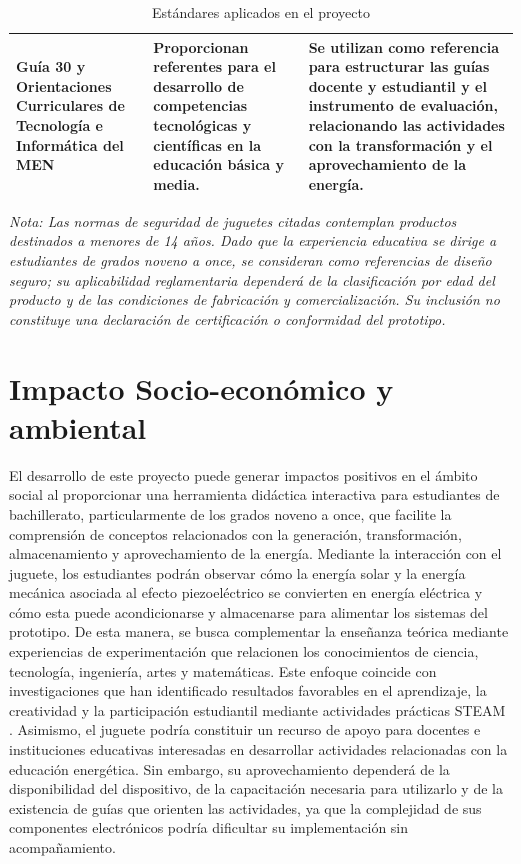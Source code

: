 \documentclass[11pt]{article}
\begin{document}
\begin{table}[H]
\begin{tabular}{|p{3.5cm}|p{5cm}|p{7cm}|}
Guía 30 y Orientaciones Curriculares de Tecnología e Informática del MEN &
Proporcionan referentes para el desarrollo de competencias tecnológicas y científicas en la educación básica y media. &
Se utilizan como referencia para estructurar las guías docente y estudiantil y el instrumento de evaluación, relacionando las actividades con la transformación y el aprovechamiento de la energía. \\
\hline

\end{tabular}

\caption{Estándares aplicados en el proyecto}
\label{tab:estandares}
\end{table}

\noindent\footnotesize
\textit{Nota: Las normas de seguridad de juguetes citadas contemplan productos destinados a menores de 14 años. Dado que la experiencia educativa se dirige a estudiantes de grados noveno a once, se consideran como referencias de diseño seguro; su aplicabilidad reglamentaria dependerá de la clasificación por edad del producto y de las condiciones de fabricación y comercialización. Su inclusión no constituye una declaración de certificación o conformidad del prototipo.}
\normalsize


\newpage
\section{Impacto Socio-económico y ambiental}
El desarrollo de este proyecto puede generar impactos positivos en el ámbito social al proporcionar una herramienta didáctica interactiva para estudiantes de bachillerato, particularmente de los grados noveno a once, que facilite la comprensión de conceptos relacionados con la generación, transformación, almacenamiento y aprovechamiento de la energía. Mediante la interacción con el juguete, los estudiantes podrán observar cómo la energía solar y la energía mecánica asociada al efecto piezoeléctrico se convierten en energía eléctrica y cómo esta puede acondicionarse y almacenarse para alimentar los sistemas del prototipo. De esta manera, se busca complementar la enseñanza teórica mediante experiencias de experimentación que relacionen los conocimientos de ciencia, tecnología, ingeniería, artes y matemáticas. Este enfoque coincide con investigaciones que han identificado resultados favorables en el aprendizaje, la creatividad y la participación estudiantil mediante actividades prácticas STEAM \cite{kanapathy2024,hsiao2022}. Asimismo, el juguete podría constituir un recurso de apoyo para docentes e instituciones educativas interesadas en desarrollar actividades relacionadas con la educación energética. Sin embargo, su aprovechamiento dependerá de la disponibilidad del dispositivo, de la capacitación necesaria para utilizarlo y de la existencia de guías que orienten las actividades, ya que la complejidad de sus componentes electrónicos podría dificultar su implementación sin acompañamiento.
\end{document}
